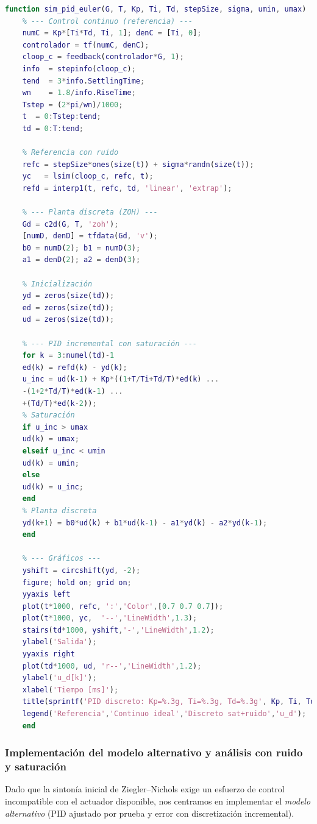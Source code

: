 \begin{lstlisting}[language=Matlab,style=matlabstyle, caption={PID discreto con saturación y ruido}, label={lst:pid_sat_noise}]
	function sim_pid_euler(G, T, Kp, Ti, Td, stepSize, sigma, umin, umax)
	% --- Control continuo (referencia) ---
	numC = Kp*[Ti*Td, Ti, 1]; denC = [Ti, 0];
	controlador = tf(numC, denC);
	cloop_c = feedback(controlador*G, 1);
	info  = stepinfo(cloop_c);
	tend  = 3*info.SettlingTime;
	wn    = 1.8/info.RiseTime;
	Tstep = (2*pi/wn)/1000;
	t  = 0:Tstep:tend;
	td = 0:T:tend;
	
	% Referencia con ruido
	refc = stepSize*ones(size(t)) + sigma*randn(size(t));
	yc   = lsim(cloop_c, refc, t);
	refd = interp1(t, refc, td, 'linear', 'extrap');
	
	% --- Planta discreta (ZOH) ---
	Gd = c2d(G, T, 'zoh');
	[numD, denD] = tfdata(Gd, 'v');
	b0 = numD(2); b1 = numD(3);
	a1 = denD(2); a2 = denD(3);
	
	% Inicialización
	yd = zeros(size(td));
	ed = zeros(size(td));
	ud = zeros(size(td));
	
	% --- PID incremental con saturación ---
	for k = 3:numel(td)-1
	ed(k) = refd(k) - yd(k);
	u_inc = ud(k-1) + Kp*((1+T/Ti+Td/T)*ed(k) ...
	-(1+2*Td/T)*ed(k-1) ...
	+(Td/T)*ed(k-2));
	% Saturación
	if u_inc > umax
	ud(k) = umax;
	elseif u_inc < umin
	ud(k) = umin;
	else
	ud(k) = u_inc;
	end
	% Planta discreta
	yd(k+1) = b0*ud(k) + b1*ud(k-1) - a1*yd(k) - a2*yd(k-1);
	end
	
	% --- Gráficos ---
	yshift = circshift(yd, -2);
	figure; hold on; grid on;
	yyaxis left
	plot(t*1000, refc, ':','Color',[0.7 0.7 0.7]);
	plot(t*1000, yc,  '--','LineWidth',1.3);
	stairs(td*1000, yshift,'-','LineWidth',1.2);
	ylabel('Salida');
	yyaxis right
	plot(td*1000, ud, 'r--','LineWidth',1.2);
	ylabel('u_d[k]');
	xlabel('Tiempo [ms]');
	title(sprintf('PID discreto: Kp=%.3g, Ti=%.3g, Td=%.3g', Kp, Ti, Td));
	legend('Referencia','Continuo ideal','Discreto sat+ruido','u_d');
	end
\end{lstlisting}

\twocolumn

\subsubsection{Implementación del modelo alternativo y análisis con ruido y saturación}

Dado que la sintonía inicial de Ziegler--Nichols exige un esfuerzo de control incompatible con el actuador disponible, nos centramos en implementar el \emph{modelo alternativo} (PID ajustado por prueba y error con discretización incremental).  

